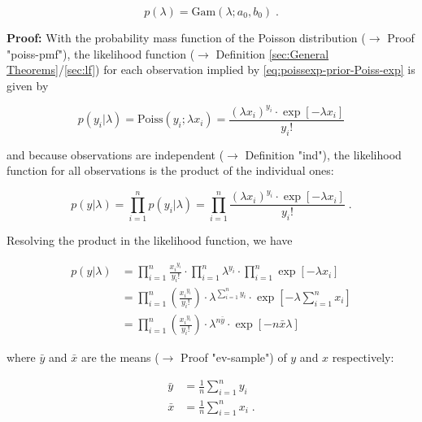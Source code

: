 \documentclass[a4paper,12pt]{book}
\begin{document}
\begin{equation} \label{eq:poissexp-prior-Poiss-exp-prior}
p(\lambda) = \mathrm{Gam}(\lambda; a_0, b_0) \; .
\end{equation}


\vspace{1em}
\textbf{Proof:} With the probability mass function of the Poisson distribution ($\rightarrow$ Proof "poiss-pmf"), the likelihood function ($\rightarrow$ Definition \ref{sec:General Theorems}/\ref{sec:lf}) for each observation implied by \eqref{eq:poissexp-prior-Poiss-exp} is given by

\begin{equation} \label{eq:poissexp-prior-Poiss-exp-LF-s1}
p(y_i|\lambda) = \mathrm{Poiss}(y_i; \lambda x_i) = \frac{(\lambda x_i)^{y_i} \cdot \exp\left[-\lambda x_i\right]}{y_i !}
\end{equation}

and because observations are independent ($\rightarrow$ Definition "ind"), the likelihood function for all observations is the product of the individual ones:

\begin{equation} \label{eq:poissexp-prior-Poiss-exp-LF-s2}
p(y|\lambda) = \prod_{i=1}^n p(y_i|\lambda) = \prod_{i=1}^n \frac{(\lambda x_i)^{y_i} \cdot \exp\left[-\lambda x_i\right]}{y_i !} \; .
\end{equation}

Resolving the product in the likelihood function, we have

\begin{equation} \label{eq:poissexp-prior-Poiss-exp-LF-s3}
\begin{split}
p(y|\lambda) &= \prod_{i=1}^n \frac{ {x_i}^{y_i}}{y_i !} \cdot \prod_{i=1}^n \lambda^{y_i} \cdot \prod_{i=1}^n \exp\left[-\lambda x_i\right] \\
&= \prod_{i=1}^n \left(\frac{ {x_i}^{y_i}}{y_i !}\right) \cdot \lambda^{\sum_{i=1}^n y_i} \cdot \exp\left[-\lambda \sum_{i=1}^n x_i\right] \\
&= \prod_{i=1}^n \left(\frac{ {x_i}^{y_i}}{y_i !}\right) \cdot \lambda^{n \bar{y}} \cdot \exp\left[-n \bar{x} \lambda\right]
\end{split}
\end{equation}

where $\bar{y}$ and $\bar{x}$ are the means ($\rightarrow$ Proof "ev-sample") of $y$ and $x$ respectively:

\begin{equation} \label{eq:poissexp-prior-xy-mean}
\begin{split}
\bar{y} &= \frac{1}{n} \sum_{i=1}^n y_i \\
\bar{x} &= \frac{1}{n} \sum_{i=1}^n x_i \; .
\end{split}
\end{equation}
\end{document}
